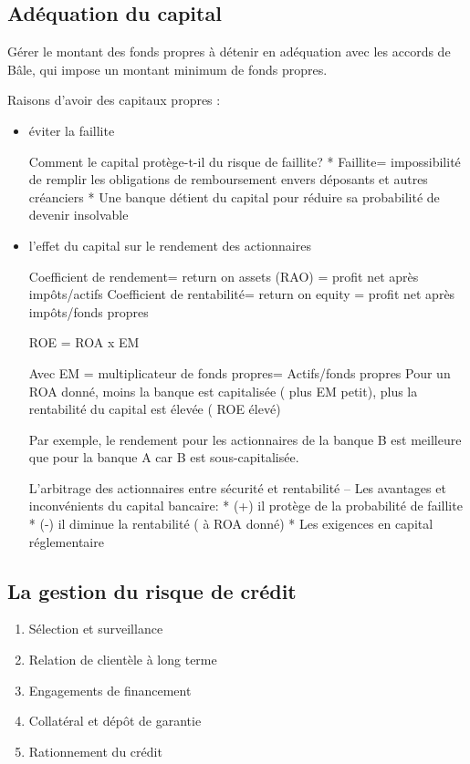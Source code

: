 	\subsection{Adéquation du capital}
	
	Gérer le montant des fonds propres à détenir en adéquation avec les accords de Bâle, qui impose un montant minimum de fonds propres.
	
	Raisons d'avoir des capitaux propres :
	
	\begin{itemize}
	
		\item éviter la faillite

	
	Comment le capital protège-t-il du risque de faillite? 
* Faillite= impossibilité de remplir les obligations de remboursement envers 
déposants et autres créanciers 
* Une banque détient du capital pour réduire sa probabilité de devenir 
insolvable 

		\item l'effet du capital sur le rendement des actionnaires
		
		Coefficient de rendement= return on assets (RAO) = profit net après 
impôts/actifs 
		Coefficient de rentabilité= return on equity = profit net après impôts/fonds 
propres 

		ROE = ROA x EM 
		
		Avec EM = multiplicateur de fonds propres= Actifs/fonds propres 
		Pour un ROA donné, moins la banque est capitalisée ( plus EM petit), plus 
la rentabilité du capital est élevée ( ROE élevé) 

		Par exemple, le rendement pour les actionnaires de la banque B est meilleure que pour la banque A car B est sous-capitalisée.
		
		
		L’arbitrage des actionnaires entre sécurité et rentabilité 
– Les avantages et inconvénients du capital bancaire: 
* (+) il protège de la probabilité de faillite 
* (-) il diminue la rentabilité ( à ROA donné) 
* Les exigences en capital réglementaire 
	\end{itemize}
	
	
	\subsection{La gestion du risque de crédit}
	
	\begin{enumerate}	
		\item Sélection et surveillance 
		\item Relation de clientèle à long terme 
		\item Engagements de financement 
		\item Collatéral et dépôt de garantie 
		\item Rationnement du crédit
	\end{enumerate}
	

